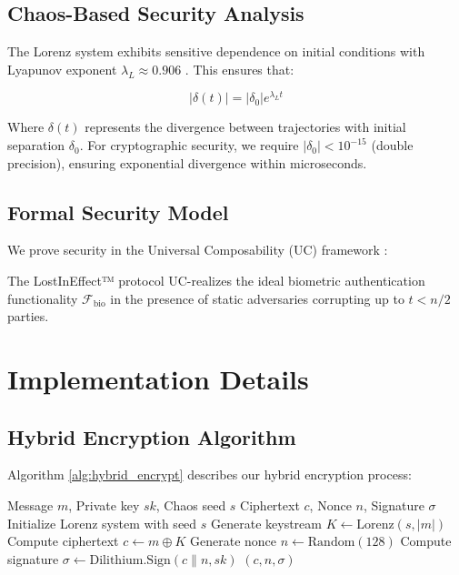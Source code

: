 \documentclass[12pt,a4paper]{article}
\begin{document}
\subsection{Chaos-Based Security Analysis}

The Lorenz system exhibits sensitive dependence on initial conditions with Lyapunov exponent $\lambda_L \approx 0.906$ \cite{wolf1985determining}. This ensures that:

\begin{equation}
|\delta(t)| = |\delta_0|e^{\lambda_L t}
\end{equation}

Where $\delta(t)$ represents the divergence between trajectories with initial separation $\delta_0$. For cryptographic security, we require $|\delta_0| < 10^{-15}$ (double precision), ensuring exponential divergence within microseconds.

\subsection{Formal Security Model}

We prove security in the Universal Composability (UC) framework \cite{canetti2001universally}:

\begin{theorem}[UC Security]
The LostInEffect™ protocol UC-realizes the ideal biometric authentication functionality $\mathcal{F}_{\text{bio}}$ in the presence of static adversaries corrupting up to $t < n/2$ parties.
\end{theorem}

\section{Implementation Details}

\subsection{Hybrid Encryption Algorithm}

Algorithm \ref{alg:hybrid_encrypt} describes our hybrid encryption process:

\begin{algorithm}[H]
\caption{Hybrid Encryption and Signing}
\label{alg:hybrid_encrypt}
\begin{algorithmic}[1]
\REQUIRE Message $m$, Private key $sk$, Chaos seed $s$
\ENSURE Ciphertext $c$, Nonce $n$, Signature $\sigma$
\STATE Initialize Lorenz system with seed $s$
\STATE Generate keystream $K \leftarrow \text{Lorenz}(s, |m|)$
\STATE Compute ciphertext $c \leftarrow m \oplus K$
\STATE Generate nonce $n \leftarrow \text{Random}(128)$
\STATE Compute signature $\sigma \leftarrow \text{Dilithium.Sign}(c \| n, sk)$
\RETURN $(c, n, \sigma)$
\end{algorithmic}
\end{algorithm}
\end{document}
